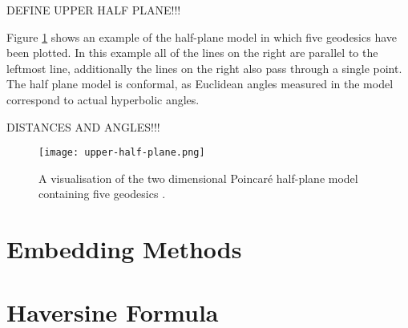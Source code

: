 DEFINE UPPER HALF PLANE!!!

Figure \ref{fig:half-plane-example} shows an example of the half-plane model in which five geodesics have been plotted. In this example all of the lines on the right are parallel to the leftmost line, additionally the lines on the right also pass through a single point. The half plane model is conformal, as Euclidean angles measured in the model correspond to actual hyperbolic angles.

DISTANCES AND ANGLES!!!

\begin{figure}
	\centering
	\texttt{[image: upper-half-plane.png]}
	\caption[A visualisation of the two dimensional Poincar\'{e} half-plane model containing five geodesics]{A visualisation of the two dimensional Poincar\'{e} half-plane model containing five geodesics .}
	\label{fig:half-plane-example}
\end{figure}

\section{Embedding Methods}
\section{Haversine Formula}